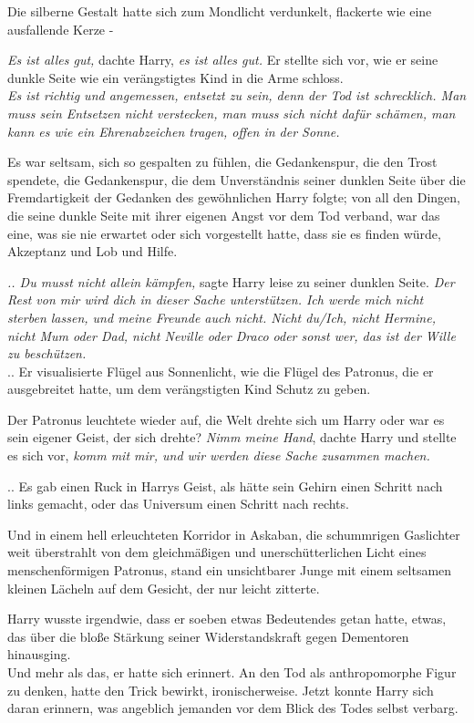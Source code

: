 {Die silberne Gestalt hatte sich zum Mondlicht verdunkelt, flackerte wie eine ausfallende Kerze -

\emph{Es ist alles gut,} dachte Harry, \emph{es ist alles gut.} Er stellte sich vor, wie er seine dunkle Seite wie ein verängstigtes Kind in die Arme schloss.\\ \emph{Es ist richtig und angemessen, entsetzt zu sein, denn der Tod ist schrecklich. Man muss sein Entsetzen nicht verstecken, man muss sich nicht dafür schämen, man kann es wie ein Ehrenabzeichen tragen, offen in der Sonne.}

Es war seltsam, sich so gespalten zu fühlen, die Gedankenspur, die den Trost spendete, die Gedankenspur, die dem Unverständnis seiner dunklen Seite über die Fremdartigkeit der Gedanken des gewöhnlichen Harry folgte; von all den Dingen, die seine dunkle Seite mit ihrer eigenen Angst vor dem Tod verband, war das eine, was sie nie erwartet oder sich vorgestellt hatte, dass sie es finden würde, Akzeptanz und Lob und Hilfe.

\emph{.. Du musst nicht allein kämpfen,} sagte Harry leise zu seiner dunklen Seite. \emph{Der Rest von mir wird dich in dieser Sache unterstützen. Ich werde mich nicht sterben lassen, und meine Freunde auch nicht. Nicht du/Ich, nicht Hermine, nicht Mum oder Dad, nicht Neville oder Draco oder sonst wer, das ist der Wille zu beschützen.}\\ .. Er visualisierte Flügel aus Sonnenlicht, wie die Flügel des Patronus, die er ausgebreitet hatte, um dem verängstigten Kind Schutz zu geben.

Der Patronus leuchtete wieder auf, die Welt drehte sich um Harry oder war es sein eigener Geist, der sich drehte? \emph{Nimm meine Hand}, dachte Harry und stellte es sich vor, \emph{komm mit mir, und wir werden diese Sache zusammen machen.}

.. Es gab einen Ruck in Harrys Geist, als hätte sein Gehirn einen Schritt nach links gemacht, oder das Universum einen Schritt nach rechts.

Und in einem hell erleuchteten Korridor in Askaban, die schummrigen Gaslichter weit überstrahlt von dem gleichmäßigen und unerschütterlichen Licht eines menschenförmigen Patronus, stand ein unsichtbarer Junge mit einem seltsamen kleinen Lächeln auf dem Gesicht, der nur leicht zitterte.

Harry wusste irgendwie, dass er soeben etwas Bedeutendes getan hatte, etwas, das über die bloße Stärkung seiner Widerstandskraft gegen Dementoren hinausging.\\ Und mehr als das, er hatte sich erinnert. An den Tod als anthropomorphe Figur zu denken, hatte den Trick bewirkt, ironischerweise. Jetzt konnte Harry sich daran erinnern, was angeblich jemanden vor dem Blick des Todes selbst verbarg.

}
